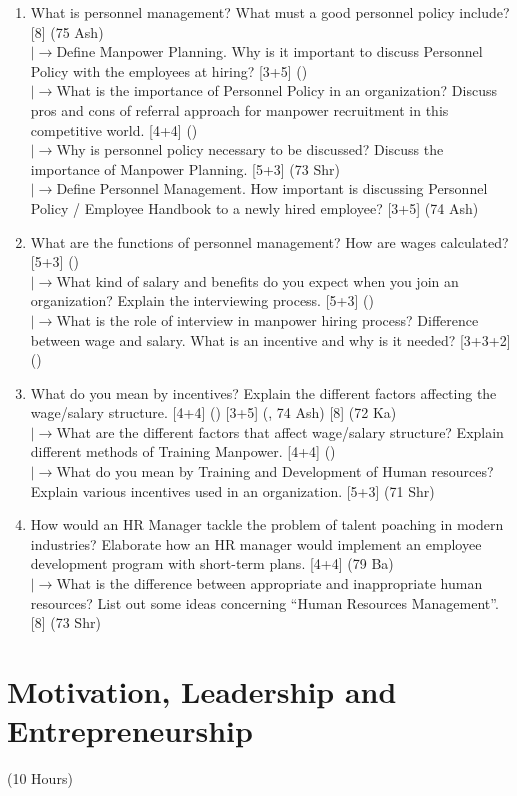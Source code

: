 \documentclass[12pt]{article}
\newcommand{\lb}{\\$\left|\rightarrow\right.$}
\begin{document}
\begin{enumerate}[topsep=0pt, noitemsep]
      \item What is personnel management? What must a good personnel policy include? \hfill [8] (75 Ash)
        \lb Define Manpower Planning. Why is it important to discuss Personnel Policy with the employees at hiring? \hfill [3+5] ()
        \lb What is the importance of Personnel Policy in an organization? Discuss pros and cons of referral approach for manpower recruitment in this competitive world. \hfill [4+4] ()
        \lb Why is personnel policy necessary to be discussed? Discuss the importance of Manpower Planning. \hfill [5+3] (73 Shr)
        \lb Define Personnel Management. How important is discussing Personnel Policy / Employee Handbook to a newly hired employee? \hfill [3+5] (74 Ash)

      \item What are the functions of personnel management? How are wages calculated? \hfill [5+3] ()
        \lb What kind of salary and benefits do you expect when you join an organization? Explain the interviewing process. \hfill [5+3] ()
        \lb What is the role of interview in manpower hiring process? Difference between wage and salary. What is an incentive and why is it needed? \hfill [3+3+2] ()

      \item What do you mean by incentives? Explain the different factors affecting the wage/salary structure. \hfill [4+4] () [3+5] (, 74 Ash) [8] (72 Ka)
        \lb What are the different factors that affect wage/salary structure? Explain different methods of Training Manpower. \hfill [4+4] ()
        \lb What do you mean by Training and Development of Human resources? Explain various incentives used in an organization. \hfill [5+3] (71 Shr)

      \item How would an HR Manager tackle the problem of talent poaching in modern industries? Elaborate how an HR manager would implement an employee development program with short-term plans. \hfill [4+4] (79 Ba)
        \lb What is the difference between appropriate and inappropriate human resources? List out some ideas concerning ``Human Resources Management''. \hfill [8] (73 Shr)
    \end{enumerate}

\pagebreak
\section{Motivation, Leadership and Entrepreneurship}
\begin{center}(10 Hours)\end{center}
\end{document}
